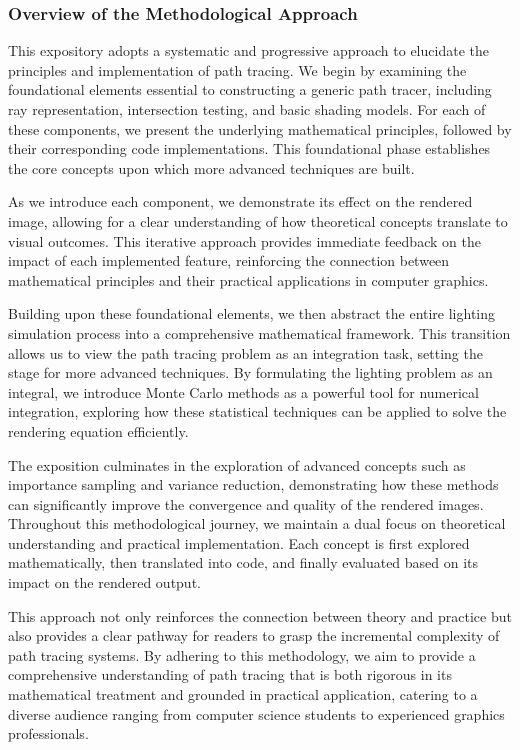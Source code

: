 \documentclass[12pt]{article}
\begin{document}
\subsubsection{Overview of the Methodological Approach}
This expository adopts a systematic and progressive approach to elucidate the principles and implementation of path tracing. We begin by examining the foundational elements essential to constructing a generic path tracer, including ray representation, intersection testing, and basic shading models. For each of these components, we present the underlying mathematical principles, followed by their corresponding code implementations. This foundational phase establishes the core concepts upon which more advanced techniques are built.

As we introduce each component, we demonstrate its effect on the rendered image, allowing for a clear understanding of how theoretical concepts translate to visual outcomes. This iterative approach provides immediate feedback on the impact of each implemented feature, reinforcing the connection between mathematical principles and their practical applications in computer graphics.

Building upon these foundational elements, we then abstract the entire lighting simulation process into a comprehensive mathematical framework. This transition allows us to view the path tracing problem as an integration task, setting the stage for more advanced techniques. By formulating the lighting problem as an integral, we introduce Monte Carlo methods as a powerful tool for numerical integration, exploring how these statistical techniques can be applied to solve the rendering equation efficiently.

The exposition culminates in the exploration of advanced concepts such as importance sampling and variance reduction, demonstrating how these methods can significantly improve the convergence and quality of the rendered images. Throughout this methodological journey, we maintain a dual focus on theoretical understanding and practical implementation. Each concept is first explored mathematically, then translated into code, and finally evaluated based on its impact on the rendered output.

This approach not only reinforces the connection between theory and practice but also provides a clear pathway for readers to grasp the incremental complexity of path tracing systems. By adhering to this methodology, we aim to provide a comprehensive understanding of path tracing that is both rigorous in its mathematical treatment and grounded in practical application, catering to a diverse audience ranging from computer science students to experienced graphics professionals.
\end{document}

